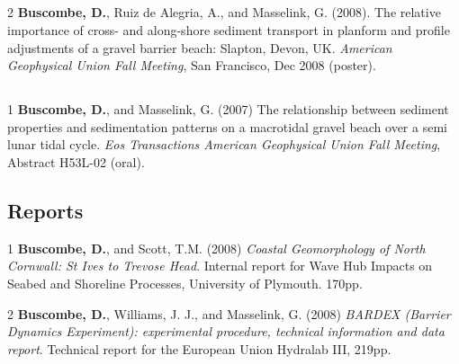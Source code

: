 \documentclass[margin,line]{resume}
\begin{document}
\begin{resume}
\begin{footnotesize}
	\subsection{}
	\begin{list1}
	
	\item[2] {\bf Buscombe, D.}, Ruiz de Alegria, A., and Masselink, G. (2008). The relative importance of cross- and along-shore sediment transport in planform and profile adjustments of a gravel barrier beach: Slapton, Devon, UK. {\sl American Geophysical Union Fall Meeting}, San Francisco, Dec 2008 (poster).
	\end{list1}
	
	\subsection{}

	\begin{list1}
	\item[1] {\bf Buscombe, D.}, and Masselink, G. (2007) The relationship between sediment properties and sedimentation patterns on a macrotidal gravel beach over a semi lunar tidal cycle. {\sl Eos Transactions American Geophysical Union Fall Meeting}, Abstract H53L-02 (oral).
	
	
	\end{list1}
	
	        \end{footnotesize}

	\subsection{\mysidestyle Reports}
        \begin{footnotesize}
	\begin{list1}
	 
	\item[1] {\bf Buscombe, D.}, and Scott, T.M. (2008) {\sl Coastal Geomorphology of North Cornwall: St Ives to Trevose Head}. Internal report for Wave Hub Impacts on Seabed and Shoreline Processes, University of Plymouth. 170pp.\\
	\item[2] {\bf Buscombe, D.}, Williams, J. J., and Masselink, G. (2008) {\sl BARDEX (Barrier Dynamics Experiment): experimental procedure, technical information and data report}. Technical report for the European Union Hydralab III, 219pp. 


\end{list1}
\end{footnotesize}
\end{resume}
\end{document}
